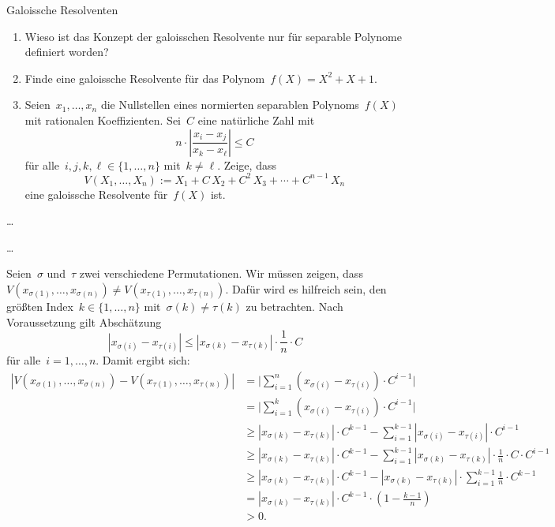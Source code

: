 \documentclass{algblatt}
\begin{document}
\begin{aufgabe}{Galoissche Resolventen}
\begin{enumerate}
\item Wieso ist das Konzept der galoisschen Resolvente nur für separable
Polynome definiert worden?

\item Finde eine galoissche Resolvente für das Polynom~$f(X) = X^2 + X + 1$.

\item Seien~$x_1,\ldots,x_n$ die Nullstellen eines normierten separablen
Polynoms~$f(X)$ mit rationalen Koeffizienten. Sei~$C$ eine natürliche Zahl mit
\[ n \cdot \left|\frac{x_i - x_j}{x_k - x_\ell}\right| \leq C \]
für alle~$i,j,k,\ell \in \{ 1,\ldots,n \}$ mit~$k \neq \ell$. Zeige, dass
\[ V(X_1,\ldots,X_n) := X_1 + C\,X_2 + C^2\,X_3 + \cdots + C^{n-1}\,X_n \]
eine galoissche Resolvente für~$f(X)$ ist.
\end{enumerate}

\begin{loesungE}
\item \ldots

\item \ldots

\item Seien~$\sigma$ und~$\tau$ zwei verschiedene Permutationen. Wir müssen
zeigen, dass~$V(x_{\sigma(1)},\ldots,x_{\sigma(n)}) \neq
V(x_{\tau(1)},\ldots,x_{\tau(n)})$. Dafür wird es hilfreich sein, den größten
Index~$k \in \{ 1,\ldots,n \}$ mit~$\sigma(k) \neq \tau(k)$ zu betrachten. Nach
Voraussetzung gilt Abschätzung
\[ |x_{\sigma(i)} - x_{\tau(i)}| \leq
  |x_{\sigma(k)} - x_{\tau(k)}| \cdot
  \frac{1}{n} \cdot C \]
für alle~$i = 1,\ldots,n$. Damit ergibt sich:
\begin{align*}
  |V(x_{\sigma(1)},\ldots,x_{\sigma(n)}) - V(x_{\tau(1)},\ldots,x_{\tau(n)})| &=
  \Biggl|\sum_{i=1}^n (x_{\sigma(i)} - x_{\tau(i)}) \cdot C^{i-1}\Biggr| \\
  &= \Biggl|\sum_{i=1}^k (x_{\sigma(i)} - x_{\tau(i)}) \cdot C^{i-1}\Biggr| \\
  &\geq |x_{\sigma(k)} - x_{\tau(k)}| \cdot C^{k-1} - \sum_{i=1}^{k-1}
  |x_{\sigma(i)} - x_{\tau(i)}| \cdot C^{i-1}\\
  &\geq |x_{\sigma(k)} - x_{\tau(k)}| \cdot C^{k-1} - \sum_{i=1}^{k-1}
  |x_{\sigma(k)} - x_{\tau(k)}| \cdot \frac{1}{n} \cdot C \cdot C^{i-1} \\
  &\geq |x_{\sigma(k)} - x_{\tau(k)}| \cdot C^{k-1} - |x_{\sigma(k)} -
  x_{\tau(k)}| \cdot \sum_{i=1}^{k-1}
  \frac{1}{n} \cdot C^{k-1} \\
  &= |x_{\sigma(k)} - x_{\tau(k)}| \cdot C^{k-1} \cdot \left(1 -
  \frac{k-1}{n}\right) \\
  &> 0.
\end{align*}
\end{loesungE}
\end{aufgabe}
\end{document}
